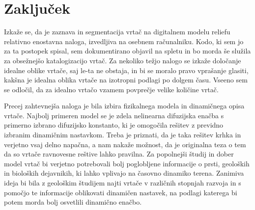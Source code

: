 \documentclass[a4paper, oneside, 12pt]{book}
\begin{document}
        \chapter{Zaključek}

        Izkaže se, da je zaznava in segmentacija vrtač na digitalnem modelu reliefu relativno enostavna naloga, izvedljiva na osebnem računalniku. Kodo, ki sem jo za ta postopek spisal, sem dokumentirano objavil na spletu in bo morda še služila za obsežnejšo katalogizacijo vrtač.
        Za nekoliko težjo nalogo se izkaže določanje idealne oblike vrtače, saj le-ta ne obstaja, in bi se moralo pravo vprašanje glasiti, kakšna je idealna oblika vrtače na izotropni podlagi po dolgem času. Vseeno sem se odločil, da za idealno vrtačo vzamem povprečje velike količine vrtač.

        Precej zahtevnejša naloga je bila izbira fizikalnega modela in dinamičnega opisa vrtače. Najbolj primeren model se je zdela nelinearna difuzijska enačba s primerno izbrano difuzijsko konstanto, ki je omogočila rešitev z previdno izbranim dinamičnim nastavkom. Treba je priznati, da je taka rešitev krhka in verjetno vsaj delno napačna, a nam nakaže možnost, da je originalna teza o tem da so vrtače ravnovesne reštive lahko pravilna.
        Za popolnejši študij in dober model vrtač bi verjetno potrebovali bolj poglobljene informacije o prsti, geoloških in bioloških dejavnikih, ki lahko vplivajo na časovno dinamiko terena. Zanimiva ideja bi bila z geološkim študijem najti vrtače v različnih stopnjah razvoja in s pomočjo te informacije oblikovati dinamičen nastavek, na podlagi katerega bi potem morda bolj osvetlili dinamično enačbo.

        \nocite{*}
        \newpage
        {}
        


        
\end{document}

